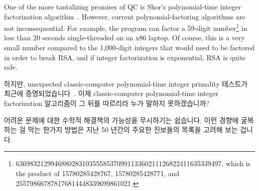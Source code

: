 One of the more tantalizing promises of QC is Shor's
polynomial-time integer factorization
algorithm~\cite{Shor:1997:PAP:264393.264406,WikipediaShorsAlgorithm}.
However, current polynomial-factoring algorithms are not
inconsequential.
For example, the  program can factor a 59-digit number\footnote{
	\scriptsize
	63698321299468802831035558537099113360211126822411635339497,
	which is the product of 15780285428767, 15780285428771, and
	255798667878176814448339699861021.}
in less than 20 seconds single-threaded on an x86 laptop.
Of course, this is a very small number compared to the 1,000-digit
integers that would need to be factored in order to break RSA,
and if integer factorization is exponential, RSA is quite safe.
\fi

하지만, unexpected classic-computer polynomial-time integer primality 테스트가
최근에
증명되었습니다~\cite{ManindraAgrawal2004PrimesIsInP,WikipediaAKSPrimalityTest}.
이제 classic-computer polynomial-time integer factorization 알고리즘이 그 뒤를
따르리라 누가 말하지 못하겠습니까?

어려운 문제에 대한 수학적 해결책의 가능성을 무시하기는 쉽습니다.
이런 경향에 굴복하는 걸 막는 한가지 방법은 지난 50 년간의 주요한 진보들의
목록을 고려해 보는 겁니다.

